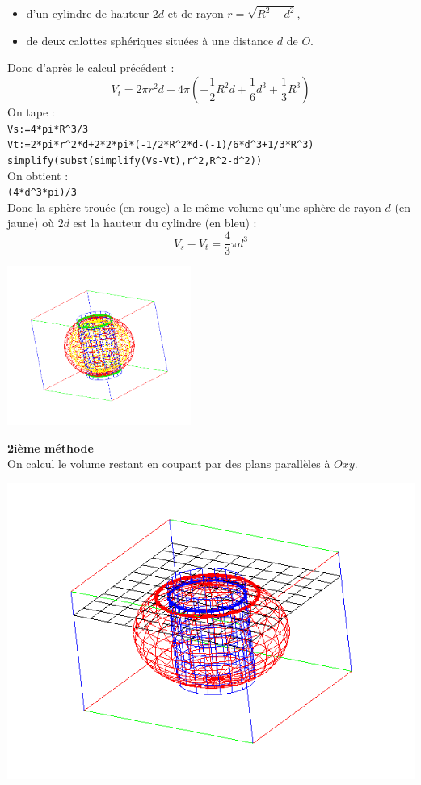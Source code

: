 \documentclass[a4paper,11pt]{book}
\begin{document}
\begin{itemize}
\item d'un cylindre de hauteur $2d$ et de rayon $r=\sqrt{R^2-d^2}$, 
\item de deux calottes sph\'eriques situ\'ees \`a une distance $d$ de $O$.
\end{itemize}
Donc d'apr\`es le calcul pr\'ec\'edent :
$$V_t=2\pi r^2d+4\pi(-\frac{1}{2}R^2d+\frac{1}{6}d^3+\frac{1}{3}R^3)$$
On tape :\\
{\tt Vs:=4*pi*R\verb|^|3/3}\\
{\tt Vt:=2*pi*r\verb|^|2*d+2*2*pi*(-1/2*R\verb|^|2*d-(-1)/6*d\verb|^|3+1/3*R\verb|^|3)}\\
{\tt simplify(subst(simplify(Vs-Vt),r\verb|^|2,R\verb|^|2-d\verb|^|2))}\\
On obtient :\\
{\tt (4*d\verb|^|3*pi)/3}\\
Donc la sph\`ere trou\'ee (en rouge) a le m\^eme volume qu'une sph\`ere de 
rayon $d$ (en jaune) o\`u $2d$ est la hauteur du cylindre (en bleu) :
$$V_s-V_t=\frac{4}{3}\pi d^3$$
\begin{center}\includegraphics[width=6cm]{spheres}\end{center}
{\bf 2i\`eme m\'ethode}\\
On calcul le volume restant en coupant par des plans parall\`eles \`a $Oxy$.

\includegraphics[width=\textwidth]{spheretroue}
\end{document}
